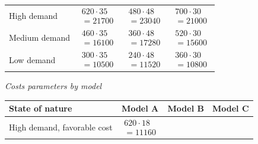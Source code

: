 \begin{ExamProblems}
\begin{center}
\begin{tabular}{l c c c}
				\midrule
				High demand &
				$\begin{array}{l}
					620\cdot 35\\
					= 21700
				\end{array}$ &
				$\begin{array}{l}
					480\cdot 48\\
					= 23040
				\end{array}$ &
				$\begin{array}{l}
					700\cdot 30\\
					= 21000
				\end{array}$ \\
				Medium demand &
				$\begin{array}{l}
					460\cdot 35\\
					= 16100
				\end{array}$ &
				$\begin{array}{l}
					360\cdot 48\\
					= 17280
				\end{array}$ &
				$\begin{array}{l}
					520\cdot 30\\
					= 15600
				\end{array}$ \\
				Low demand &
				$\begin{array}{l}
					300\cdot 35\\
					= 10500
				\end{array}$ &
				$\begin{array}{l}
					240\cdot 48\\
					= 11520
				\end{array}$ &
				$\begin{array}{l}
					360\cdot 30\\
					= 10800
				\end{array}$ \\
				\bottomrule
			\end{tabular}
		\end{center}
		\begin{center}
			\textit{Costs parameters by model} \\
			\begin{tabular}{l c c c}
				\toprule
				State of nature & Model A & Model B & Model C \\
				\midrule
				High demand, favorable cost &
				$\begin{array}{l}
					620\cdot 18\\
					= 11160
				\end{array}$ &

\end{tabular}
\end{center}
\end{ExamProblems}
